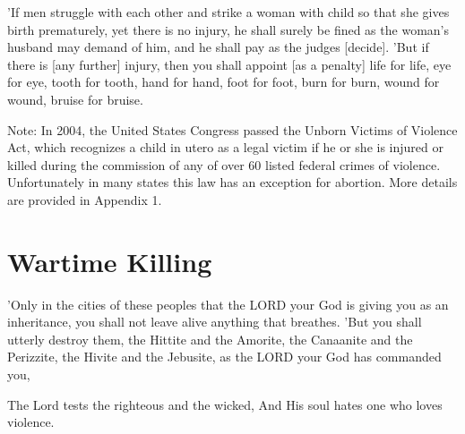 \begin{scripture}[Exodus 21:22-25]
    'If men struggle with each other and strike a woman with child so that she gives birth prematurely, yet there is no injury, he shall surely be fined as the woman's husband may demand of him, and he shall pay as the judges [decide].
    'But if there is [any further] injury, then you shall appoint [as a penalty] life for life,
    eye for eye, tooth for tooth, hand for hand, foot for foot,
    burn for burn, wound for wound, bruise for bruise.
\end{scripture}
\vspace{3\baselineskip}

\begin{small}
Note: In 2004, the United States Congress passed the Unborn Victims of Violence Act, which recognizes a child in
utero as a legal victim if he or she is injured or killed during the commission of any of over 60 listed federal crimes of violence. Unfortunately in many
states this law has an exception for abortion. More details are provided in Appendix 1.
\end{small}

\newpage
\section{Wartime Killing}
\begin{scripture}[Deuteronomy 20:16-17]
    'Only in the cities of these peoples that the LORD your God is giving you as an inheritance, you shall not leave alive anything that breathes.
    'But you shall utterly destroy them, the Hittite and the Amorite, the Canaanite and the Perizzite, the Hivite and the Jebusite, as the LORD your God has commanded you,
\end{scripture}


\vspace{4\baselineskip}

\begin{scripture}[Psalm 11:5]
     
    The Lord tests the righteous and the wicked, And His soul hates one who loves violence.
\end{scripture}

